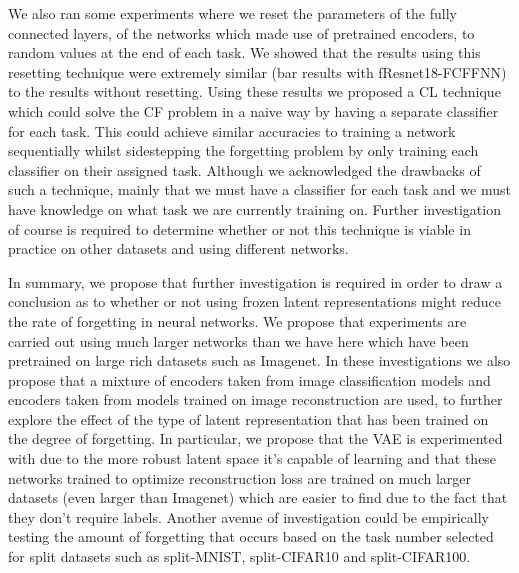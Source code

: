 We also ran some experiments where we reset the parameters of the fully connected layers, of the networks which made use of pretrained encoders, to random values at the end of each task. We showed that the results using this resetting technique were extremely similar (bar results with fResnet18-FCFFNN) to the results without resetting. Using these results we proposed a CL technique which could solve the CF problem in a naive way by having a separate classifier for each task. This could achieve similar accuracies to training a network sequentially whilst sidestepping the forgetting problem by only training each classifier on their assigned task. Although we acknowledged the drawbacks of such a technique, mainly that we must have a classifier for each task and we must have knowledge on what task we are currently training on. Further investigation of course is required to determine whether or not this technique is viable in practice on other datasets and using different networks. 

In summary, we propose that further investigation is required in order to draw a conclusion as to whether or not using frozen latent representations might reduce the rate of forgetting in neural networks. We propose that experiments are carried out using much larger networks than we have here which have been pretrained on large rich datasets such as Imagenet. In these investigations we also propose that a mixture of encoders taken from image classification models and encoders taken from models trained on image reconstruction are used, to further explore the effect of the type of latent representation that has been trained on the degree of forgetting. In particular, we propose that the VAE \cite{kingma2013auto} is experimented with due to the more robust latent space it's capable of learning and that these networks trained to optimize reconstruction loss are trained on much larger datasets (even larger than Imagenet) which are easier to find due to the fact that they don't require labels. Another avenue of investigation could be empirically testing the amount of forgetting that occurs based on the task number selected for split datasets such as split-MNIST, split-CIFAR10 and split-CIFAR100. 
